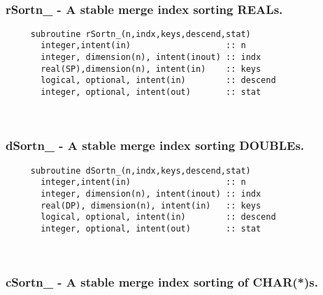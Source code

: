  
\mbox{}\hrulefill\ 
 

  \subsubsection{rSortn\_ - A stable merge index sorting REALs.}

\begin{verbatim} 
     subroutine rSortn_(n,indx,keys,descend,stat)
       integer,intent(in)                   :: n
       integer, dimension(n), intent(inout) :: indx
       real(SP),dimension(n), intent(in)    :: keys
       logical, optional, intent(in)        :: descend
       integer, optional, intent(out)       :: stat
 \end{verbatim}%
 
 
\mbox{}\hrulefill\ 
 

  \subsubsection{dSortn\_ - A stable merge index sorting DOUBLEs.}

\begin{verbatim} 
     subroutine dSortn_(n,indx,keys,descend,stat)
       integer,intent(in)                   :: n
       integer, dimension(n), intent(inout) :: indx
       real(DP), dimension(n), intent(in)   :: keys
       logical, optional, intent(in)        :: descend
       integer, optional, intent(out)       :: stat
 \end{verbatim}%
 
 
\mbox{}\hrulefill\ 
 

  \subsubsection{cSortn\_ - A stable merge index sorting of CHAR(*)s.}

